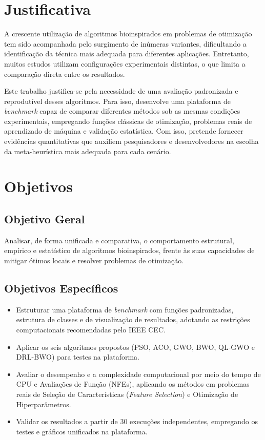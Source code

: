 \documentclass[12pt, a4paper, oneside]{report}
\begin{document}


\section{Justificativa}

A crescente utilização de algoritmos bioinspirados em problemas de otimização tem sido acompanhada pelo surgimento de inúmeras variantes, dificultando a identificação da técnica mais adequada para diferentes aplicações. Entretanto, muitos estudos utilizam configurações experimentais distintas, o que limita a comparação direta entre os resultados.

Este trabalho justifica-se pela necessidade de uma avaliação padronizada e reprodutível desses algoritmos. Para isso, desenvolve uma plataforma de \textit{benchmark} capaz de comparar diferentes métodos sob as mesmas condições experimentais, empregando funções clássicas de otimização, problemas reais de aprendizado de máquina e validação estatística. Com isso, pretende fornecer evidências quantitativas que auxiliem pesquisadores e desenvolvedores na escolha da meta-heurística mais adequada para cada cenário.

\section{Objetivos} \label{sec:objetivos}

\subsection{Objetivo Geral}
Analisar, de forma unificada e comparativa, o comportamento estrutural, empírico e estatístico de algoritmos bioinspirados, frente às suas capacidades de mitigar ótimos locais e resolver problemas de otimização.

\subsection{Objetivos Específicos}
\begin{itemize}
    \item Estruturar uma plataforma de \textit{benchmark} com funções padronizadas, estrutura de classes e de visualização de resultados, adotando as restrições computacionais recomendadas pelo IEEE CEC. 
    \item Aplicar os seis algoritmos propostos (PSO, ACO, GWO, BWO, QL-GWO e DRL-BWO) para testes na plataforma.
    \item Avaliar o desempenho e a complexidade computacional por meio do tempo de CPU e Avaliações de Função (NFEs), aplicando os métodos em problemas reais de Seleção de Características (\textit{Feature Selection}) e Otimização de Hiperparâmetros.
    \item Validar os resultados a partir de 30 execuções independentes, empregando os testes e gráficos unificados na plataforma.
\end{itemize}
\end{document}
